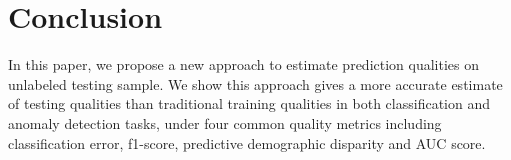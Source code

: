 \section{Conclusion}

In this paper, we propose a new approach to estimate 
prediction qualities on unlabeled testing sample. 
We show this approach gives a more accurate estimate of 
testing qualities than traditional training qualities 
in both classification and anomaly detection tasks, 
under four common quality metrics including 
classification error, f1-score, predictive demographic 
disparity and AUC score. 


